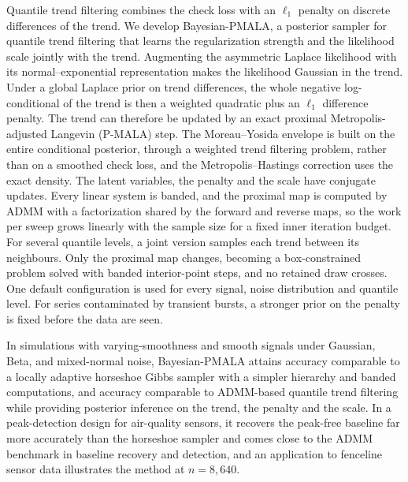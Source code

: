 Quantile trend filtering combines the check loss with an $\ell_1$ penalty on discrete differences of the trend. We develop Bayesian-PMALA, a posterior sampler for quantile trend filtering that learns the regularization strength and the likelihood scale jointly with the trend. Augmenting the asymmetric Laplace likelihood with its normal--exponential representation makes the likelihood Gaussian in the trend. Under a global Laplace prior on trend differences, the whole negative log-conditional of the trend is then a weighted quadratic plus an $\ell_1$ difference penalty. The trend can therefore be updated by an exact proximal Metropolis-adjusted Langevin (P-MALA) step. The Moreau--Yosida envelope is built on the entire conditional posterior, through a weighted trend filtering problem, rather than on a smoothed check loss, and the Metropolis--Hastings correction uses the exact density. The latent variables, the penalty and the scale have conjugate updates. Every linear system is banded, and the proximal map is computed by ADMM with a factorization shared by the forward and reverse maps, so the work per sweep grows linearly with the sample size for a fixed inner iteration budget. For several quantile levels, a joint version samples each trend between its neighbours. Only the proximal map changes, becoming a box-constrained problem solved with banded interior-point steps, and no retained draw crosses. One default configuration is used for every signal, noise distribution and quantile level. For series contaminated by transient bursts, a stronger prior on the penalty is fixed before the data are seen.

In simulations with varying-smoothness and smooth signals under Gaussian, Beta, and mixed-normal noise, Bayesian-PMALA attains accuracy comparable to a locally adaptive horseshoe Gibbs sampler with a simpler hierarchy and banded computations, and accuracy comparable to ADMM-based quantile trend filtering while providing posterior inference on the trend, the penalty and the scale. In a peak-detection design for air-quality sensors, it recovers the peak-free baseline far more accurately than the horseshoe sampler and comes close to the ADMM benchmark in baseline recovery and detection, and an application to fenceline sensor data illustrates the method at $n = 8{,}640$.

